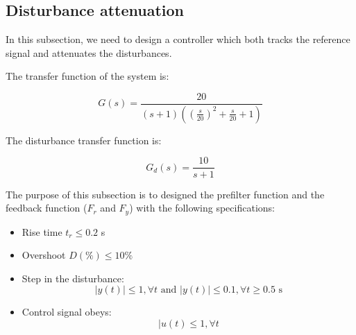 \subsection{Disturbance attenuation}

In this subsection, we need to design a controller which both tracks the reference signal and attenuates the disturbances. 

The transfer function of the system is:

$$G(s) = \frac{20}{(s+1)((\frac{s}{20})^2+\frac{s}{20}+1)}$$

The disturbance transfer function is:

$$G_d(s) = \frac{10}{s+1}$$

The purpose of this subsection is to designed the prefilter function and the feedback function ($F_r$ and $F_y$) with the following specifications:

\begin{itemize}
    \item Rise time $t_r \leq 0.2$ s
    \item Overshoot $D(\%) \leq 10\%$
    \item Step in the disturbance:
        $$|y(t)| \leq 1, \forall t \text{ and } |y(t)| \leq 0.1, \forall t \geq 0.5\text{ s}$$ 
    \item Control signal obeys:
        $$|u(t) \leq 1, \forall t$$
\end{itemize}


% 
% 
% 
